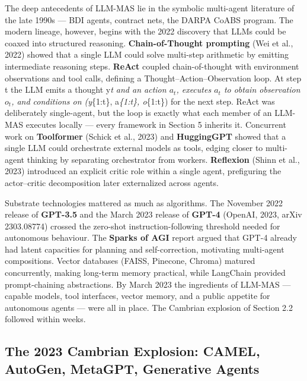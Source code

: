 \documentclass{article}
\begin{document}
The deep antecedents of LLM-MAS lie in the symbolic multi-agent literature of the late 1990s --- BDI agents, contract nets, the DARPA CoABS program. The modern lineage, however, begins with the 2022 discovery that LLMs could be coaxed into structured reasoning. \textbf{Chain-of-Thought prompting} (Wei et al., 2022) showed that a single LLM could solve multi-step arithmetic by emitting intermediate reasoning steps. \textbf{ReAct} \citep{yao2023reactsynergizingre} coupled chain-of-thought with environment observations and tool calls, defining a Thought--Action--Observation loop. At step t the LLM emits a thought y\emph{t and an action \(a_t\), executes \(a_t\) to obtain observation \(o_t\), and conditions on (y}\{1:t\}, a\emph{\{1:t\}, o}\{1:t\}) for the next step. ReAct was deliberately single-agent, but the loop is exactly what each member of an LLM-MAS executes locally --- every framework in Section 5 inherits it. Concurrent work on \textbf{Toolformer} (Schick et al., 2023) and \textbf{HuggingGPT} showed that a single LLM could orchestrate external models as tools, edging closer to multi-agent thinking by separating orchestrator from workers. \textbf{Reflexion} (Shinn et al., 2023) introduced an explicit critic role within a single agent, prefiguring the actor--critic decomposition later externalized across agents.

Substrate technologies mattered as much as algorithms. The November 2022 release of \textbf{GPT-3.5} and the March 2023 release of \textbf{GPT-4} (OpenAI, 2023, arXiv 2303.08774) crossed the zero-shot instruction-following threshold needed for autonomous behaviour. The \textbf{Sparks of AGI} report \citep{bubeck20232023} argued that GPT-4 already had latent capacities for planning and self-correction, motivating multi-agent compositions. Vector databases (FAISS, Pinecone, Chroma) matured concurrently, making long-term memory practical, while LangChain provided prompt-chaining abstractions. By March 2023 the ingredients of LLM-MAS --- capable models, tool interfaces, vector memory, and a public appetite for autonomous agents --- were all in place. The Cambrian explosion of Section 2.2 followed within weeks.

\subsection{The 2023 Cambrian Explosion: CAMEL, AutoGen, MetaGPT, Generative Agents}\label{the-2023-cambrian-explosion-camel-autogen-metagpt-generative-agents}
\end{document}
